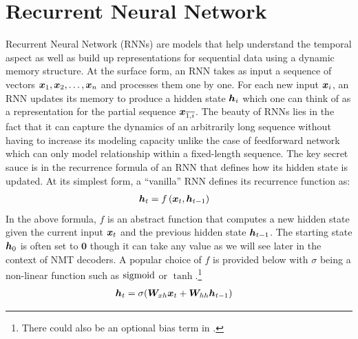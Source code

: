 \section{Recurrent Neural Network}
\label{sec:rnn}
Recurrent Neural Network (RNNs) \cite{elman90} are models that help understand
the temporal aspect as well as build up representations for sequential data
using a dynamic memory structure. At the surface form, an RNN takes as input a sequence of vectors $\bm{x}_{1},
\bm{x}_{2}, \ldots, \bm{x}_{n}$ and processes them one by one. For each
new input $\bm{x}_{i}$, an RNN updates its memory to produce a hidden state
$\bm{h}_{i}$ which one can think of as a representation for the partial sequence
$\bm{x}_{\overline{1,i}}$. %
The beauty of RNNs lies in the fact that it can
capture the dynamics of an arbitrarily long sequence without having to increase its modeling
capacity unlike the case of feedforward network which can only model
relationship within a fixed-length sequence. The key secret sauce is in the
recurrence formula of an RNN that defines how its hidden state is updated. At
its simplest form, a ``vanilla'' RNN defines its recurrence function as:
\begin{align}
\bm{h}_{t} &= f\left(\bm{x}_{t}, \bm{h}_{t-1}\right) \label{e:abstract_rnn}
\end{align}
In the above formula, $f$ is an abstract function that computes a new hidden state given the current input $\bm{x}_{t}$ and the
previous hidden state $\bm{h}_{t-1}$. The starting state $\bm{h}_{0}$ is often set to
$\bm{0}$ though it can take any value as we will see later in the context
of NMT decoders. A popular choice of $f$ is provided below with $\sigma$ being a
non-linear function such as $\operatorname{sigmoid}$ or $\tanh$.\footnote{There could also be
an optional bias term in .}
\begin{align}
\hid{t} &= \sigma(\W{xh}\x{t} + \W{hh}\hid{t-1} \label{e:vanilla_rnn}) %
\end{align}

